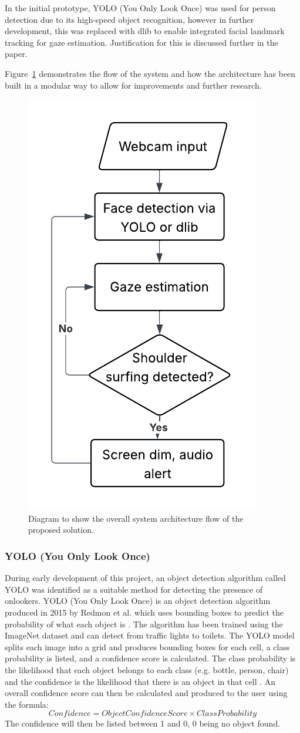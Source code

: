 \documentclass[12pt]{article}
\theoremstyle{plain}
\theoremstyle{definition}
\begin{document}
In the initial prototype, YOLO (You Only Look Once) \cite{redmon_you_2016} was used for person detection due to its high-speed object recognition, however in further development, this was replaced with dlib to enable integrated facial landmark tracking for gaze estimation. Justification for this is discussed further in the paper.

Figure~\ref{fig:architecture} demonstrates the flow of the system and how the architecture has been built in a modular way to allow for improvements and further research.

\begin{figure}[h!]
    \centering
    \includegraphics[width=0.3\linewidth]{img/architecture.png}
    \caption{Diagram to show the overall system architecture flow of the proposed solution.}
    \label{fig:architecture}
\end{figure}


\subsubsection{YOLO (You Only Look Once)}
\label{YOLO}

During early development of this project, an object detection algorithm called YOLO \cite{redmon_you_2016} was identified as a suitable method for detecting the presence of onlookers.
YOLO (You Only Look Once) is an object detection algorithm produced in 2015 by Redmon et al. which uses bounding boxes to predict the probability of what each object is \cite{redmon_you_2016}. The algorithm has been trained using the ImageNet dataset \cite{noauthor_imagenet_nodate} and can detect from traffic lights to toilets. The YOLO model splits each image into a grid and produces bounding boxes for each cell, a class probability is listed, and a confidence score is calculated. The class probability is the likelihood that each object belongs to each class (e.g. bottle, person, chair) and the confidence is the likelihood that there is an object in that cell \cite{redmon_you_2016}. An overall confidence score can then be calculated and produced to the user using the formula: 
\[
  Confidence = Object Confidence Score \times Class Probability
\]
The confidence will then be listed between 1 and 0, 0 being no object found.
\end{document}
